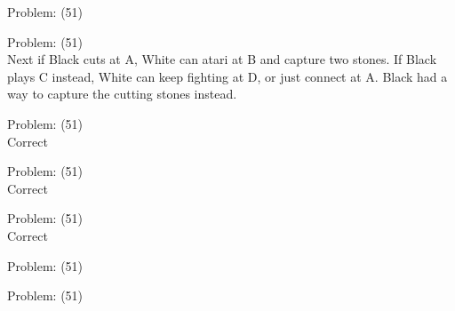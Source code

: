 \documentclass[11pt]{article}
\begin{document}
\begin{minipage}[t]{0.5\textwidth}
  {\centering
  
  Problem: (51)\\
  
  }
\end{minipage}
\begin{minipage}[t]{0.5\textwidth}
  {\centering
  
  Problem: (51)\\
  Next if Black cuts at A, White can atari at B and capture two stones. If Black plays C instead, White can keep fighting at D, or just connect at A. Black had a way to capture the cutting stones instead.\\
  }
\end{minipage}
\begin{minipage}[t]{0.5\textwidth}
  {\centering
  
  Problem: (51)\\
  Correct\\
  }
\end{minipage}
\begin{minipage}[t]{0.5\textwidth}
  {\centering
  
  Problem: (51)\\
  Correct\\
  }
\end{minipage}
\begin{minipage}[t]{0.5\textwidth}
  {\centering
  
  Problem: (51)\\
  Correct\\
  }
\end{minipage}
\begin{minipage}[t]{0.5\textwidth}
  {\centering
  
  Problem: (51)\\
  
  }
\end{minipage}
\begin{minipage}[t]{0.5\textwidth}
  {\centering
  
  Problem: (51)\\
  
  }
\end{minipage}
\end{document}
